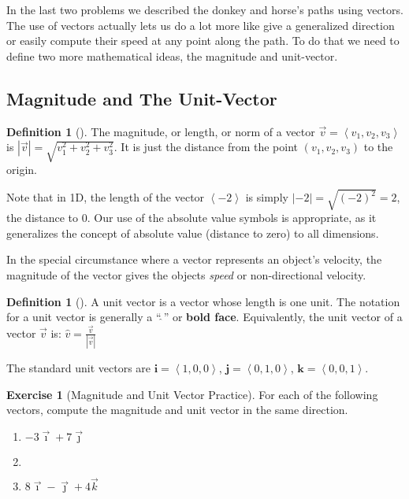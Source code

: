 \documentclass[10pt,]{book}
\newcommand{\terminology}[1]{\textbf{#1}}
\theoremstyle{plain}
\theoremstyle{definition}
\newtheorem{definition}[theorem]{Definition}
\theoremstyle{definition}
\theoremstyle{definition}
\theoremstyle{definition}
\newtheorem{exploration}[project]{Exercise}
\theoremstyle{definition}
\numberwithin{equation}{section}
\newcommand{\ii}{\vec \imath}
\newcommand{\jj}{\vec \jmath}
\newcommand{\kk}{\vec k}
\newcommand{\lt}{<}
\begin{document}
In the last two problems we described the donkey and horse's paths using vectors. The use of vectors actually lets us do a lot more like give a generalized direction or easily compute their speed at any point along the path. To do that we need to define two more mathematical ideas, the magnitude and unit-vector.%
\typeout{************************************************}
\typeout{************************************************}
\subsection[{Magnitude and The Unit-Vector}]{Magnitude and The Unit-Vector}\label{subsection-6}
\begin{definition}[{}]\label{definition-5}
The magnitude, or length, or norm of a vector \(\vec v = \left\lt v_1,v_2,v_3\right>\) is \(|\vec v| = \sqrt{v_1^2+v_2^2+v_3^2}\). It is just the distance from the point \((v_1,v_2,v_3)\) to the origin.%
\par
Note that in 1D, the length of the vector \(\left\lt -2\right>\) is simply \(|-2|=\sqrt{(-2)^2}=2\), the distance to 0. Our use of the absolute value symbols is appropriate, as it generalizes the concept of absolute value (distance to zero) to all dimensions.%
\end{definition}
In the special circumstance where a vector represents an object's velocity, the magnitude of the vector gives the objects \emph{speed} or non-directional velocity.%
\begin{definition}[{}]\label{definition-6}
A unit vector is a vector whose length is one unit. The notation for a unit vector is generally a ``\(\hat{\ }\)'' or \terminology{bold face}. Equivalently, the unit vector of a vector \(\vec{v}\) is: \(\hat{v}=\frac{\vec{v}}{|\vec{v}|}\)%
\par
The standard unit vectors are \(\mathbf{i}=\left\lt 1,0,0\right>\), \(\mathbf{j}=\left\lt 0,1,0\right>\), \(\mathbf{k}=\left\lt 0,0,1\right>\).%
\end{definition}
\begin{exploration}[Magnitude and Unit Vector Practice]\label{exploration-24}
For each of the following vectors, compute the magnitude and unit vector in the same direction.%
\begin{enumerate}[font=\bfseries,label=(\alph*),ref=\alph*]
\item\label{task-43} \(-3\ii + 7 \jj\)%
\item\label{task-44} \(\lt -4,2,4>\)%
\item\label{task-45} \(8\ii - \jj + 4 \kk\)%
\end{enumerate}
\end{exploration}
\end{document}
